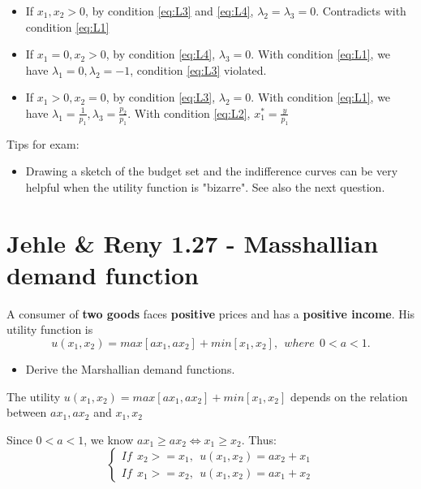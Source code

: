 \documentclass{article}
\begin{document}
\begin{mdframed}[backgroundcolor=blue!20,linecolor=white]
\begin{itemize}
\item If $x_1,x_2>0$, by condition \ref{eq:L3} and \ref{eq:L4}, $\lambda_2 = \lambda_3 =0$.
Contradicts with condition \ref{eq:L1}

\item If $x_1=0,x_2>0$, by condition \ref{eq:L4}, $\lambda_3 =0$.
With condition \ref{eq:L1}, we have $\lambda_1 =0, \lambda_2 = -1$, condition \ref{eq:L3} violated.

\item If $x_1>0,x_2=0$, by condition \ref{eq:L3}, $\lambda_2 =0$.
With condition \ref{eq:L1}, we have $\lambda_1 =\frac{1}{p_1}, \lambda_3 = \frac{p_2}{p_1}$.
With condition \ref{eq:L2}, $x_1^* = \frac{y}{p_1}$
\end{itemize}
\end{mdframed}

\begin{mdframed}[backgroundcolor=yellow!20,linecolor=white]
Tips for exam:
\begin{itemize}

\item Drawing a sketch of the budget set and the indifference curves can be very helpful when the utility 
function is "bizarre". See also the next question.

\end{itemize}

\end{mdframed}

\section{Jehle \& Reny 1.27 - Masshallian demand function}

A consumer of \textbf{two goods} faces \textbf{positive} prices and has a \textbf{positive income}. 
His utility function is $$u(x_1, x_2) = max[ax_1, ax_2] + min[x_1, x_2], \ \ where \ \ 0 < a < 1.$$
\begin{itemize}
\item Derive the Marshallian demand functions.
\end{itemize}

The utility $u(x_1, x_2) = max[ax_1, ax_2] + min[x_1, x_2]$ depends on the relation between $ax_1, ax_2$ and $x_1, x_2$

Since $0 < a < 1$, we know $ax_1 \ge ax_2 \iff x_1 \ge x_2$. Thus:
\begin{equation}
  \begin{cases}
If \ \ x_2 >= x_1 ,\ \ u(x_1, x_2) = ax_2 + x_1  \\
If \ \ x_1 >= x_2 ,\ \ u(x_1, x_2) = ax_1 + x_2
  \end{cases}
 \label{eq:mm}
\end{equation}
\end{document}
